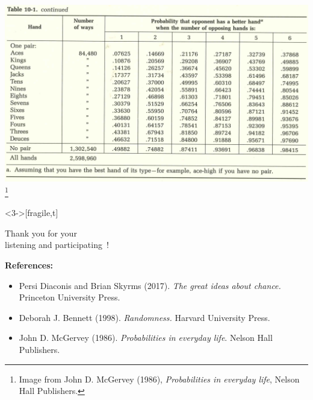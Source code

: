 \documentclass[9pt]{beamer}
\begin{document}
\begin{frame}[fragile,t] %
\begin{center}
	\includegraphics[scale=0.25]{figs/Poker-2.png}
  \footnote{Image from John D. McGervey (1986), {\it Probabilities in everyday life}, Nelson Hall
  Publishers.}
\end{center}
\end{frame}
\begin{frame}<3->[fragile,t] %
  \vfill

 \begin{center}
   \huge

   Thank you for your \\
   listening and participating~!

 \end{center}
 \vfill

 {\noindent \bf References:}\\
 \begin{itemize}
   \item Persi Diaconis and Brian Skyrms (2017). {\it The great ideas about chance.} Princeton
     University Press.
   \item Deborah J. Bennett (1998). {\it Randomness.} Harvard University Press.
   \item John D. McGervey (1986). {\it Probabilities in everyday life}. Nelson Hall Publishers.
 \end{itemize}

\end{frame}
\end{document}
